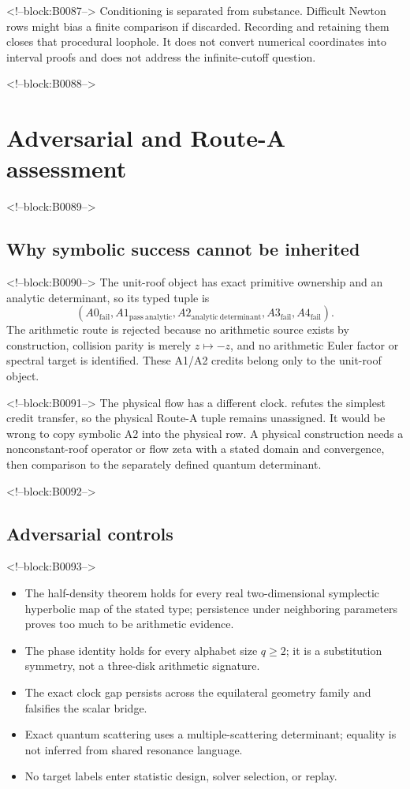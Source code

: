 \documentclass[11pt,a4paper]{article}
\theoremstyle{definition}
\theoremstyle{remark}
\begin{document}
<!--block:B0087-->
Conditioning is separated from substance. Difficult Newton rows might bias a finite comparison if discarded. Recording and retaining them closes that procedural loophole. It does not convert numerical coordinates into interval proofs and does not address the infinite-cutoff question.

<!--block:B0088-->
\section{Adversarial and Route-A assessment}

<!--block:B0089-->
\subsection{Why symbolic success cannot be inherited}

<!--block:B0090-->
The unit-roof object has exact primitive ownership and an analytic determinant, so its typed tuple is
\[
 (A0_{\mathrm{fail}},A1_{\mathrm{pass\ analytic}},
 A2_{\mathrm{analytic\ determinant}},A3_{\mathrm{fail}},A4_{\mathrm{fail}}).
\]
The arithmetic route is rejected because no arithmetic source exists by construction, collision parity is merely \(z\mapsto-z\), and no arithmetic Euler factor or spectral target is identified. These A1/A2 credits belong only to the unit-roof object.

<!--block:B0091-->
The physical flow has a different clock.  refutes the simplest credit transfer, so the physical Route-A tuple remains unassigned. It would be wrong to copy symbolic A2 into the physical row. A physical construction needs a nonconstant-roof operator or flow zeta with a stated domain and convergence, then comparison to the separately defined quantum determinant.

<!--block:B0092-->
\subsection{Adversarial controls}

<!--block:B0093-->
\begin{itemize}
 \item The half-density theorem holds for every real two-dimensional symplectic hyperbolic map of the stated type; persistence under neighboring parameters proves too much to be arithmetic evidence.
 \item The phase identity holds for every alphabet size \(q\ge2\); it is a substitution symmetry, not a three-disk arithmetic signature.
 \item The exact clock gap persists across the equilateral geometry family and falsifies the scalar bridge.
 \item Exact quantum scattering uses a multiple-scattering determinant; equality is not inferred from shared resonance language.
 \item No target labels enter statistic design, solver selection, or replay.
\end{itemize}
\end{document}
